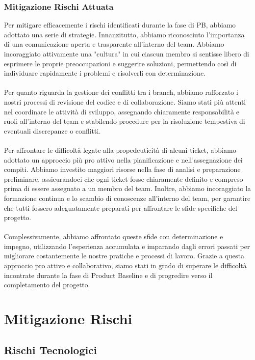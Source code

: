 \documentclass[5pt]{article}
\begin{document}
    \subsubsection{Mitigazione Rischi Attuata}
    Per mitigare efficacemente i rischi identificati durante la fase di PB, abbiamo adottato una serie di strategie. Innanzitutto, abbiamo riconosciuto l'importanza di una comunicazione aperta e trasparente all'interno del team. Abbiamo incoraggiato attivamente una "cultura" in cui ciascun membro si sentisse libero di esprimere le proprie preoccupazioni e suggerire soluzioni, permettendo così di individuare rapidamente i problemi e risolverli con determinazione.\\\\
    Per quanto riguarda la gestione dei conflitti tra i branch, abbiamo rafforzato i nostri processi di revisione del codice e di collaborazione. Siamo stati più attenti nel coordinare le attività di sviluppo, assegnando chiaramente responsabilità e ruoli all'interno del team e stabilendo procedure per la risoluzione tempestiva di eventuali discrepanze o conflitti.\\\\
    Per affrontare le difficoltà legate alla propedeuticità di alcuni ticket, abbiamo adottato un approccio più pro attivo nella pianificazione e nell'assegnazione dei compiti. Abbiamo investito maggiori risorse nella fase di analisi e preparazione preliminare, assicurandoci che ogni ticket fosse chiaramente definito e compreso prima di essere assegnato a un membro del team. Inoltre, abbiamo incoraggiato la formazione continua e lo scambio di conoscenze all'interno del team, per garantire che tutti fossero adeguatamente preparati per affrontare le sfide specifiche del progetto.\\\\
    Complessivamente, abbiamo affrontato queste sfide con determinazione e impegno, utilizzando l'esperienza accumulata e imparando dagli errori passati per migliorare costantemente le nostre pratiche e processi di lavoro. Grazie a questa approccio pro attivo e collaborativo, siamo stati in grado di superare le difficoltà incontrate durante la fase di Product Baseline e di progredire verso il completamento del progetto.
    

\section{Mitigazione Rischi}

\subsection{Rischi Tecnologici}
\end{document}
